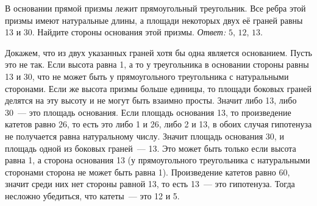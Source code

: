 \problem
В основании прямой призмы лежит прямоугольный треугольник.
Все ребра этой призмы имеют натуральные длины, а площади некоторых двух её
граней равны 13 и 30.
Найдите стороны основания этой призмы.
\solution
\emph{Ответ:} $5$, $12$, $13$.
\par
Докажем, что из двух указанных граней хотя бы одна является основанием.
Пусть это не так.
Если высота равна 1, а то у треугольника в основании стороны равны 13 и 30, что
не может быть у прямоугольного треугольника с натуральными сторонами.
Если же высота призмы больше единицы, то площади боковых граней делятся на эту
высоту и не могут быть взаимно просты.
Значит либо 13, либо 30~--- это площадь основания.
Если площадь основания 13, то произведение катетов равно 26, то есть это либо 1
и 26, либо 2 и 13, в обоих случая гипотенуза не получается равна натуральному
числу.
Значит площадь основания 30, и площадь одной из боковых граней~--- 13.
Это может быть только если высота равна 1, а сторона основания 13
(у прямоугольного треугольника с натуральными сторонами сторона не может быть
равна 1).
Произведение катетов равно 60, значит среди них нет стороны равной 13, то есть
13~--- это гипотенуза.
Тогда несложно убедиться, что катеты~--- это 12 и 5.
\endproblem
